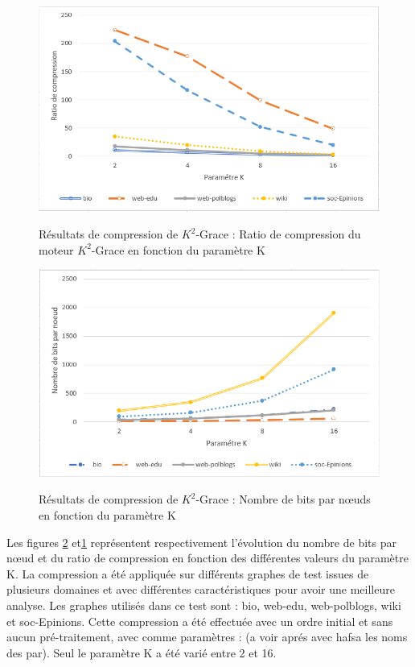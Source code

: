 \begin{figure}[H]
	\centering
	\includegraphics[scale=0.9]{ressources/image/Tests/K2-paraK-Ratio.png}
	\label{fig:K2-paraK-Ratio}
	\caption{Résultats de compression de $K^2$-Grace : Ratio de compression du moteur $K^2$-Grace en fonction du paramètre K}
\end{figure}

\begin{figure}[H]
	\centering
	\includegraphics[scale=0.9]{ressources/image/Tests/K2-paraK-NBbits.png}
	\label{fig:K2-paraK-NBbits}
	\caption{Résultats de compression de $K^2$-Grace : Nombre de bits par nœuds en fonction du paramètre K}
\end{figure}		


Les figures \ref{fig:K2-paraK-NBbits} et\ref{fig:K2-paraK-Ratio} représentent respectivement l'évolution du nombre de bits par nœud et du ratio de compression en fonction des différentes valeurs du paramètre K. La compression a été appliquée sur différents graphes de test issues de plusieurs domaines et avec différentes caractéristiques pour avoir une meilleure analyse. Les graphes utilisés dans ce test sont : bio, web-edu, web-polblogs, wiki et soc-Epinions. Cette compression a été effectuée avec un ordre initial et sans aucun pré-traitement, avec comme paramètres :  (a voir aprés avec hafsa les noms des par). Seul le paramètre K a été varié entre 2 et 16.



